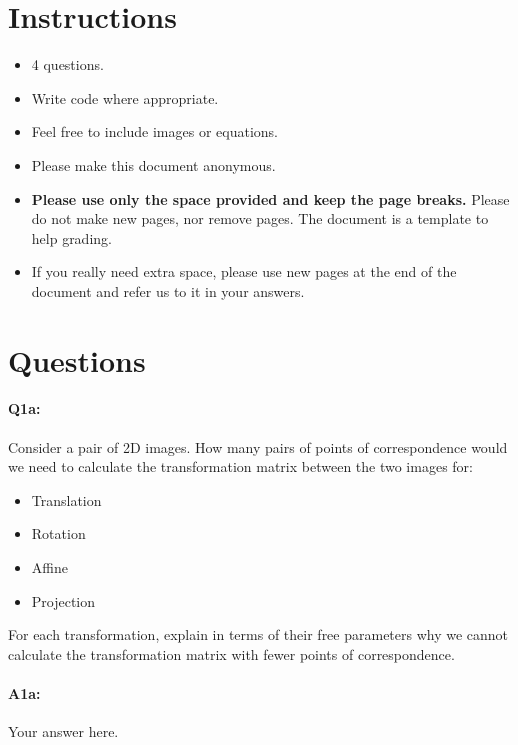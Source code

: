 \section*{Instructions}
\begin{itemize}
  \item 4 questions.
  \item Write code where appropriate.
  \item Feel free to include images or equations.
  \item Please make this document anonymous.
  \item \textbf{Please use only the space provided and keep the page breaks.} Please do not make new pages, nor remove pages. The document is a template to help grading.
  \item If you really need extra space, please use new pages at the end of the document and refer us to it in your answers.
\end{itemize}

\section*{Questions}


\paragraph{Q1a:} 
Consider a pair of 2D images. How many pairs of points of correspondence would we need to calculate the transformation matrix between the two images for: 

\begin{itemize}
    \item Translation
    \item Rotation
    \item Affine
    \item Projection
\end{itemize}

For each transformation, explain in terms of their free parameters why we cannot calculate the transformation matrix with fewer points of correspondence. 



\paragraph{A1a:} Your answer here.


\pagebreak
